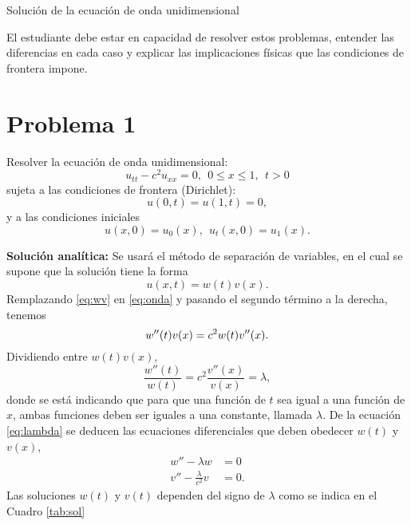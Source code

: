 \documentclass[11pt]{article}
\begin{document}
\begin{center}
{\Large Soluci\'on de la ecuaci\'on de onda unidimensional}
\end{center}

El estudiante debe estar en capacidad de resolver estos problemas, entender
las diferencias en cada caso y explicar las implicaciones f\'isicas que las condiciones
de frontera impone.

\section*{Problema 1}
\noindent Resolver la ecuaci\'on de onda unidimensional:
\begin{equation}
  \label{eq:onda}
  u_{tt} - c^2 u_{xx} = 0,~~0 \le x \le 1,~~t>0
\end{equation}
sujeta a las condiciones de frontera (Dirichlet):
\begin{equation}
  \label{eq:dirich}
  u(0,t) = u(1,t) = 0,
\end{equation}
y a las condiciones iniciales
\begin{equation}
  \label{eq:6}
  u(x,0) = u_0(x),~~u_t(x,0)=u_1(x).
\end{equation}

{\bf Soluci\'on anal\'itica:} Se usar\'a el m\'etodo de separaci\'on de variables, en el cual se supone que la soluci\'on tiene la forma
\begin{equation}
  \label{eq:wv}
  u(x,t) = w(t)v(x).
\end{equation}
Remplazando \eqref{eq:wv} en \eqref{eq:onda} y pasando el segundo t\'ermino a la derecha, tenemos
\begin{equation}
  w''(t)v(x) = c^2w(t)v''(x). \\
\end{equation}
Dividiendo entre $w(t)v(x)$,
\begin{equation}
  \label{eq:lambda}
    \frac{w''(t)}{w(t)} = c^2\frac{v''(x)}{v(x)} = \lambda,
\end{equation}
donde se est\'a  indicando que para que una funci\'on de $t$ sea igual a una funci\'on de $x$, ambas funciones deben ser iguales a una constante, llamada $\lambda$. De la ecuaci\'on \eqref{eq:lambda} se deducen las ecuaciones diferenciales que deben obedecer $w(t)$ y $v(x)$,
\begin{eqnarray}
  \label{eq:4}
  w'' - \lambda w  &= 0 \\
  v'' - \frac{\lambda}{c^2}v &= 0.
\end{eqnarray}
Las soluciones $w(t)$ y $v(t)$ dependen del signo de $\lambda$ como se indica en el Cuadro \ref{tab:sol}
\end{document}
